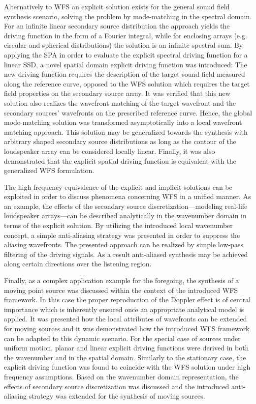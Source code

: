 Alternatively to WFS an explicit solution exists for the general sound field synthesis scenario, solving the problem by mode-matching in the spectral domain.
For an infinite linear secondary source distribution the approach yields the driving function in the form of a Fourier integral, while for enclosing arrays (e.g. circular and spherical distributions) the solution is an infinite spectral sum.
By applying the SPA in order to evaluate the explicit spectral driving function for a linear SSD, a novel spatial domain explicit driving function was introduced: 
The new driving function requires the description of the target sound field measured along the reference curve, opposed to the WFS solution which requires the target field properties on the secondary source array.
It was verified that this new solution also realizes the wavefront matching of the target wavefront and the secondary sources' wavefronts on the prescribed reference curve.
Hence, the global mode-matching solution was transformed asymptotically into a local wavefront matching approach.
This solution may be generalized towards the synthesis with arbitrary shaped secondary source distributions as long as the contour of the loudspeaker array can be considered locally linear.
Finally, it was also demonstrated that the explicit spatial driving function is equivalent with the generalized WFS formulation.

The high frequency equivalence of the explicit and implicit solutions can be exploited in order to discuss phenomena concerning WFS in a unified manner.
As an example, the effects of the secondary source discretization---modeling real-life loudspeaker arrays---can be described analytically in the wavenumber domain in terms of the explicit solution.
By utilizing the introduced local wavenumber concept, a simple anti-aliasing strategy was presented in order to suppress the aliasing wavefronts.
The presented approach can be realized by simple low-pass filtering of the driving signals. 
As a result anti-aliased synthesis may be achieved along certain directions over the listening region.

Finally, as a complex application example for the foregoing, the synthesis of a moving point source was discussed within the context of the introduced WFS framework.
In this case the proper reproduction of the Doppler effect is of central importance which is inherently ensured once an appropriate analytical model is applied.
It was presented how the local attributes of wavefronts can be extended for moving sources and it was demonstrated how the introduced WFS framework can be adapted to this dynamic scenario.
For the special case of sources under uniform motion, planar and linear explicit driving functions were derived in both the wavenumber and in the spatial domain.
Similarly to the stationary case, the explicit driving function was found to coincide with the WFS solution under high frequency assumptions.
Based on the wavenumber domain representation, the effects of secondary source discretization was discussed and the introduced anti-aliasing strategy was extended for the synthesis of moving sources.

